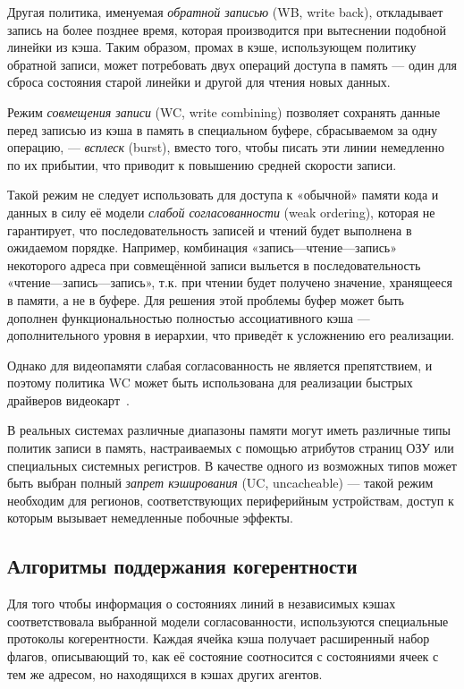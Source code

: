 Другая политика, именуемая \textit{обратной записью} (WB, \abbr write back), откладывает запись на более позднее время, которая производится при вытеснении подобной линейки из кэша. Таким образом, промах в кэше, использующем политику обратной записи, может потребовать двух операций доступа в память --- один для сброса состояния старой линейки и другой для чтения новых данных.

Режим \textit{совмещения записи} (WC, \abbr write combining) позволяет сохранять данные перед записью из кэша в память в специальном буфере, сбрасываемом за одну операцию, --- \textit{всплеск} (\abbr burst), вместо того, чтобы  писать эти линии немедленно по их прибытии, что приводит к повышению средней скорости записи. %

Такой режим не следует использовать для доступа к «обычной» памяти кода и данных в силу её модели \textit{слабой согласованности} (\abbr weak ordering), которая не гарантирует, что последовательность записей и чтений будет выполнена в ожидаемом порядке. Например, комбинация «запись---чтение---запись» некоторого адреса при совмещённой записи выльется в последовательность «чтение---запись---запись», т.к. при чтении будет получено значение, хранящееся в памяти, а не в буфере. Для решения этой проблемы буфер может быть дополнен функциональностью полностью ассоциативного кэша --- дополнительного уровня в иерархии, что приведёт к усложнению его реализации.

Однако для видеопамяти слабая согласованность не является препятствием, и поэтому политика WC может быть использована для реализации быстрых драйверов видеокарт~\cite{wc-guidelines}.

В реальных системах различные диапазоны памяти могут иметь различные типы политик записи в память, настраиваемых с помощью атрибутов страниц ОЗУ или специальных системных регистров. В качестве одного из возможных типов может быть выбран полный \textit{запрет кэширования} (UC, \abbr uncacheable) --- такой режим необходим для регионов, соответствующих периферийным устройствам, доступ к которым вызывает немедленные побочные эффекты.

\subsection[Алгоритмы поддержания когерентности]{Алгоритмы поддержания когерентности}

Для того чтобы информация о состояниях линий в независимых кэшах соответствовала выбранной модели согласованности, используются специальные протоколы когерентности. Каждая ячейка кэша получает расширенный набор флагов, описывающий то, как её состояние соотносится с состояниями ячеек с тем же адресом, но находящихся в кэшах других агентов.

